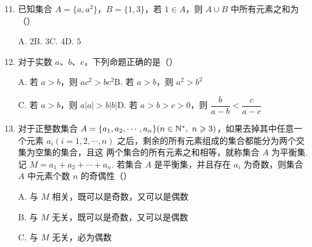 \documentclass[a4paper,11pt]{article}
\begin{document}
\begin{enumerate}
\setcounter{enumi}{10}

\item 已知集合 $A=\{a,a^2\}$，$B=\{1,3\}$，若 $1\in A$，则 $A\cup B$ 中所有元素之和为\mbox{（\quad）}

\keepwithprev
A. $2$\qquad B. $3$\qquad C. $4$\qquad D. $5$


\ifanswer
\solbegin
{}
\solend

\fi

\item 对于实数 $a$、$b$、$c$，下列命题正确的是\mbox{（\quad）}

\keepwithprev
A. 若 $a>b$，则 $ac^2>bc^2$\qquad B. 若 $a>b$，则 $a^2>b^2$

C. 若 $a>b$，则 $a|a|>b|b|$\qquad D. 若 $a>b>c>0$，则 $\dfrac{b}{a-b}<\dfrac{c}{a-c}$


\ifanswer
\solbegin
{}
\solend

\fi

\item 对于正整数集合 $A=\{a_1,a_2,\cdots,a_n\}(n\in\mathbb{N}^*,\ n\geqslant 3)$，如果去掉其中任意一个元素
$a_i(i=1,2,\cdots,n)$ 之后，剩余的所有元素组成的集合都能分为两个交集为空集的集合，且这
两个集合的所有元素之和相等，就称集合 $A$ 为平衡集. 记 $M=a_1+a_2+\cdots+a_n$. 若集合 $A$
是平衡集，并且存在 $a_i$ 为奇数，则集合 $A$ 中元素个数 $n$ 的奇偶性\mbox{（\quad）}

\keepwithprev
A. 与 $M$ 相关，既可以是奇数，又可以是偶数

B. 与 $M$ 无关，既可以是奇数，又可以是偶数

C. 与 $M$ 无关，必为偶数


\end{enumerate}
\end{document}
